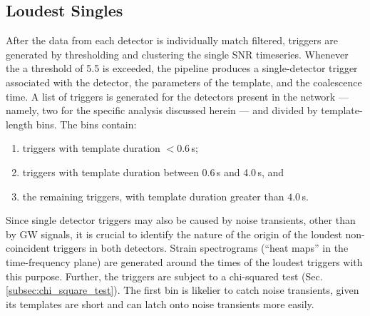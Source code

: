 \documentclass[binding=0.6cm, LaM]{sapthesis}
\begin{document}
\subsection{Loudest Singles}
	After the data from each detector is individually match filtered,
	triggers are generated by thresholding and clustering the
        single SNR timeseries.
        Whenever the a threshold of 5.5 is exceeded,
        the pipeline produces a single-detector trigger associated with the detector,
        the parameters of the template, and the coalescence time.
	A list of triggers is generated for the detectors present in the network --- namely, two for the specific analysis discussed herein --- and divided by template-length bins.  The bins contain:
	\begin{enumerate}
        \item triggers with template duration $<0.6\,$s; 
        \item triggers with template duration between 0.6\,s and 4.0\,s, and
        \item the remaining triggers, with template duration greater
          than $4.0\,$s.
        \end{enumerate}
	Since single detector triggers may also be caused by noise transients,
	other than by GW signals, 
	it is crucial to identify the nature of the origin of the loudest non-coincident triggers in both detectors.
        Strain spectrograms (``heat maps'' in the time-frequency plane) are generated around the times of the loudest triggers with this purpose.
        Further, the triggers are subject to a chi-squared test (Sec.\,\ref{subsec:chi_square_test}).
        The first bin is likelier to catch noise transients, given its templates are short and can latch onto noise transients more easily.
\end{document}

